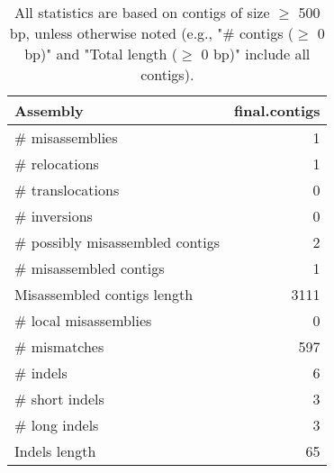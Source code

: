 \documentclass[12pt,a4paper]{article}
\begin{document}
\begin{table}[ht]
\begin{center}
\caption{All statistics are based on contigs of size $\geq$ 500 bp, unless otherwise noted (e.g., "\# contigs ($\geq$ 0 bp)" and "Total length ($\geq$ 0 bp)" include all contigs).}
\begin{tabular}{|l*{1}{|r}|}
\hline
Assembly & final.contigs \\ \hline
\# misassemblies & 1 \\ \hline
\hspace{5mm}\# relocations & 1 \\ \hline
\hspace{5mm}\# translocations & 0 \\ \hline
\hspace{5mm}\# inversions & 0 \\ \hline
\# possibly misassembled contigs & 2 \\ \hline
\# misassembled contigs & 1 \\ \hline
Misassembled contigs length & 3111 \\ \hline
\# local misassemblies & 0 \\ \hline
\# mismatches & 597 \\ \hline
\# indels & 6 \\ \hline
\hspace{5mm}\# short indels & 3 \\ \hline
\hspace{5mm}\# long indels & 3 \\ \hline
Indels length & 65 \\ \hline
\end{tabular}
\end{center}
\end{table}
\end{document}
